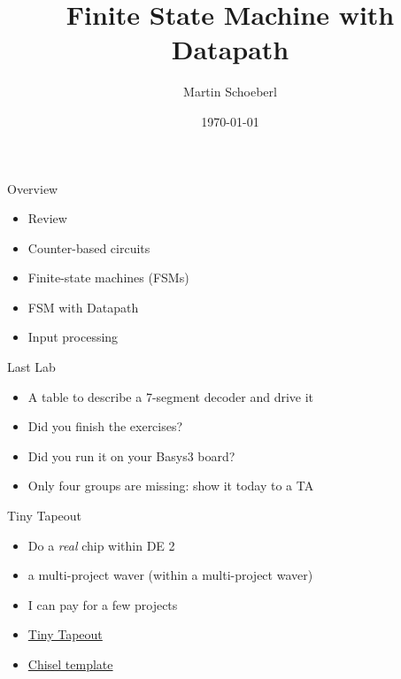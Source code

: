 

\newif\ifbook


\title{Finite State Machine with Datapath}
\author{Martin Schoeberl}
\date{\today}



\begin{frame}
\titlepage
\end{frame}




\begin{frame}[fragile]{Overview}
\begin{itemize}
\item Review 
\item Counter-based circuits
\item Finite-state machines (FSMs)
\item FSM with Datapath
\item Input processing
\end{itemize}
\end{frame}

\begin{frame}[fragile]{Last Lab}
\begin{itemize}
\item A table to describe a 7-segment decoder and drive it
\item Did you finish the exercises?
\item Did you run it on your Basys3 board?
\item Only four groups are missing: show it today to a TA
\end{itemize}
\end{frame}

\begin{frame}[fragile]{Tiny Tapeout}
\begin{itemize}
\item Do a \emph{real} chip within DE 2
\item a multi-project waver (within a multi-project waver)
\item I can pay for a few projects
\item \href{https://tinytapeout.com/}{Tiny Tapeout}
\item \href{https://github.com/TinyTapeout/ttihp-chisel-template}{Chisel template}
\end{itemize}
\end{frame}


